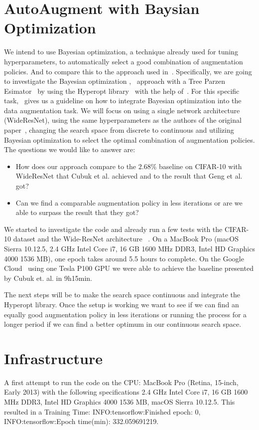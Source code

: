 \documentclass[10pt,twocolumn,letterpaper]{article}
\begin{document}
\section{AutoAugment with Baysian Optimization}

We intend to use Bayesian optimization, a technique already used for tuning hyperparameters, to automatically select a good combination of augmentation policies. And to compare this to the approach used in~\cite{Ekin}.
Specifically, we are going to investigate the Bayesian optimization \cite{2018arXiv180702811F},~\cite{Goodfellow-et-al-2016} approach with a Tree Parzen Esimator~\cite{Kaggle_AMT} by using the Hyperopt library~\cite{HyperOpt} with the help of~\cite{BO_Hyperopt}. For this specific task,~\cite{2017arXiv171010564T} gives us a guideline on how to integrate Bayesian optimization into the data augmentation task.
We will focus on using a single network architecture (WideResNet), using the same hyperparameters as the authors of the original paper~\cite{Ekin}, changing the search space from discrete to continuous and utilizing Bayesian optimization to select the optimal combination of augmentation policies. The questions we would like to answer are: 
\begin{itemize}
\item How does our approach compare to the $2.68\%$ baseline on CIFAR-10 with WideResNet that Cubuk et al. achieved and to the result that Geng et al. got? 
\item Can we find a comparable augmentation policy in less iterations or are we able to surpass the result that they got?
\end{itemize}

We started to investigate the code and already run a few tests with the CIFAR-10 dataset and the Wide-ResNet architecture ~\cite{Ekin}. On a MacBook Pro (macOS Sierra 10.12.5, 2.4 GHz Intel Core i7, 16 GB 1600 MHz DDR3, Intel HD Graphics 4000 1536 MB), one epoch takes around 5.5 hours to complete. On the Google Cloud~\cite{GCloud} using one Tesla P100 GPU we were able to achieve the baseline presented by Cubuk et. al. in 9h15min.

The next steps will be to make the search space continuous and integrate the Hyperopt library. Once the setup is working we want to see if we can find an equally good augmentation policy in less iterations or running the process for a longer period if we can find a better optimum in our continuous search space.

\section{Infrastructure}
A first attempt to run the code on the CPU: MacBook Pro (Retina, 15-inch, Early 2013) with the following specifications 2.4 GHz Intel Core i7, 16 GB 1600 MHz DDR3, Intel HD Graphics 4000 1536 MB, macOS Sierra 10.12.5. This resulted in a Training Time: INFO:tensorflow:Finished epoch: 0, INFO:tensorflow:Epoch time(min): 332.059691219. \newline
\end{document}
